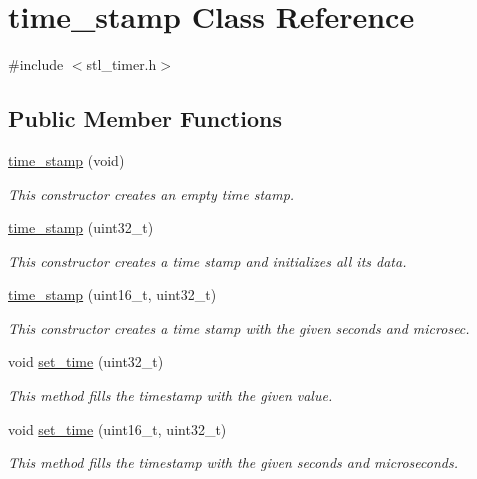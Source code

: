 \hypertarget{classtime__stamp}{\section{time\-\_\-stamp Class Reference}
\label{classtime__stamp}
}


{\ttfamily \#include $<$stl\-\_\-timer.\-h$>$}

\subsection*{Public Member Functions}
\begin{DoxyCompactItemize}
\item 
\hyperlink{classtime__stamp_a5bbbfaa47fecf276fffc179e11871407}{time\-\_\-stamp} (void)
\begin{DoxyCompactList}\small\item\em This constructor creates an empty time stamp. \end{DoxyCompactList}\item 
\hyperlink{classtime__stamp_a0c3c5d4136c9722bd1646bd4418635f0}{time\-\_\-stamp} (uint32\-\_\-t)
\begin{DoxyCompactList}\small\item\em This constructor creates a time stamp and initializes all its data. \end{DoxyCompactList}\item 
\hyperlink{classtime__stamp_af615a1f32bae4a30ea77edca55ab3b73}{time\-\_\-stamp} (uint16\-\_\-t, uint32\-\_\-t)
\begin{DoxyCompactList}\small\item\em This constructor creates a time stamp with the given seconds and microsec. \end{DoxyCompactList}\item 
void \hyperlink{classtime__stamp_adc47ce998f96a557b938a41cb2b0f669}{set\-\_\-time} (uint32\-\_\-t)
\begin{DoxyCompactList}\small\item\em This method fills the timestamp with the given value. \end{DoxyCompactList}\item 
void \hyperlink{classtime__stamp_a5f08ec008655d2de795972a5014b8896}{set\-\_\-time} (uint16\-\_\-t, uint32\-\_\-t)
\begin{DoxyCompactList}\small\item\em This method fills the timestamp with the given seconds and microseconds. \end{DoxyCompactList}\item 

\end{DoxyCompactItemize}
